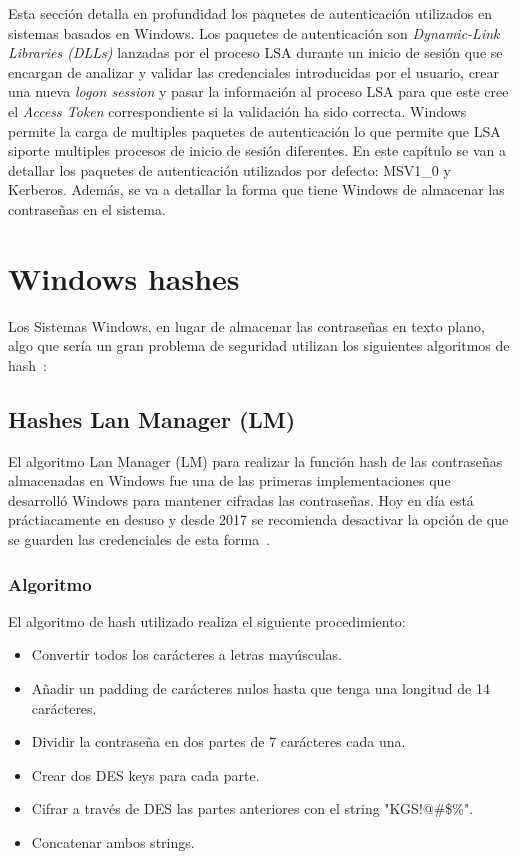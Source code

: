 Esta sección detalla en profundidad los paquetes de autenticación utilizados en sistemas basados en Windows. Los paquetes de autenticación son {\it Dynamic-Link Libraries (DLLs)} lanzadas por el proceso LSA durante un inicio de sesión que se encargan de analizar y validar las credenciales introducidas por el usuario, crear una nueva {\it logon session} y pasar la información al proceso LSA para que este cree el {\it Access Token} correspondiente si la validación ha sido correcta. Windows permite la carga de multiples paquetes de autenticación lo que permite que LSA siporte multiples procesos de inicio de sesión diferentes. En este capítulo se van a detallar los paquetes de autenticación utilizados por defecto: MSV1\_0 y Kerberos. Además, se va a detallar la forma que tiene Windows de almacenar las contraseñas en el sistema.

\section{Windows hashes}

Los Sistemas Windows, en lugar de almacenar las contraseñas en texto plano, algo que sería un gran problema de seguridad utilizan los siguientes algoritmos de hash~\cite{Capitulo3:Hashes}:

\subsection{Hashes Lan Manager (LM)}

El algoritmo Lan Manager (LM) para realizar la función hash de las contraseñas almacenadas en Windows fue una de las primeras implementaciones que desarrolló Windows para mantener cifradas las contraseñas. Hoy en día está práctiacamente en desuso y desde 2017 se recomienda desactivar la opción de que se guarden las credenciales de esta forma~\cite{Capitulo3:LMDeprecated}. 

\subsubsection{Algoritmo}

El algoritmo de hash utilizado realiza el siguiente procedimiento: 

\begin{itemize}
\item Convertir todos los carácteres a letras mayúsculas.
\item Añadir un padding de carácteres nulos hasta que tenga una longitud de 14 carácteres. 
\item Dividir la contraseña en dos partes de 7 carácteres cada una. 
\item Crear dos DES keys para cada parte. 
\item Cifrar a través de DES las partes anteriores con el string  "KGS!@\#\$\%".
\item Concatenar ambos strings.
\end{itemize}

